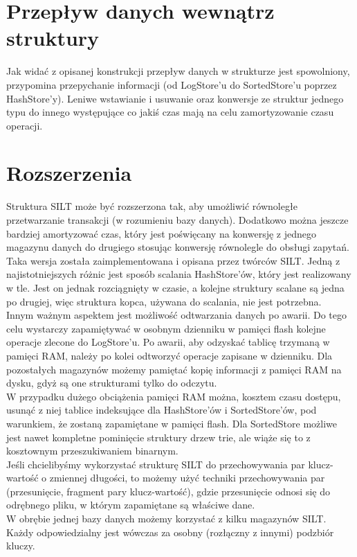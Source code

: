 \documentclass[declaration,shortabstract,masc]{iithesis}
\begin{document}
		\section{Przepływ danych wewnątrz struktury}
			Jak widać z opisanej konstrukcji przepływ danych w strukturze jest spowolniony, przypomina przepychanie informacji (od LogStore'u do SortedStore'u poprzez HashStore'y). Leniwe wstawianie i usuwanie oraz konwersje ze struktur jednego typu do innego występujące co jakiś czas mają na celu zamortyzowanie czasu operacji.
		\section{Rozszerzenia}
			Struktura SILT może być rozszerzona tak, aby umożliwić równoległe przetwarzanie transakcji (w rozumieniu bazy danych). Dodatkowo można jeszcze bardziej amortyzować czas, który jest poświęcany na konwersję z jednego magazynu danych do drugiego stosując konwersję równolegle do obsługi zapytań. Taka wersja została zaimplementowana i opisana przez twórców SILT. Jedną z najistotniejszych różnic jest sposób scalania HashStore'ów, który jest realizowany w tle. Jest on jednak rozciągnięty w czasie, a kolejne struktury scalane są jedna po drugiej, więc struktura kopca, używana do scalania, nie jest potrzebna.\\
			\indent Innym ważnym aspektem jest możliwość odtwarzania danych po awarii. Do tego celu wystarczy zapamiętywać w osobnym dzienniku w pamięci flash kolejne operacje zlecone do LogStore'u. Po awarii, aby odzyskać tablicę trzymaną w pamięci RAM, należy po kolei odtworzyć operacje zapisane w dzienniku. Dla pozostałych magazynów możemy pamiętać kopię informacji z pamięci RAM na dysku, gdyż są one strukturami tylko do odczytu.\\
			\indent W przypadku dużego obciążenia pamięci RAM można, kosztem czasu dostępu, usunąć z niej tablice indeksujące dla HashStore'ów i SortedStore'ów, pod warunkiem, że zostaną zapamiętane w pamięci flash. Dla SortedStore możliwe jest nawet kompletne pominięcie struktury drzew trie, ale wiąże się to z kosztownym przeszukiwaniem binarnym.\\
			\indent Jeśli chcielibyśmy wykorzystać strukturę SILT do przechowywania par klucz-wartość o zmiennej długości, to możemy użyć techniki przechowywania par (przesunięcie, fragment pary klucz-wartość), gdzie przesunięcie odnosi się do odrębnego pliku, w którym zapamiętane są właściwe dane.\\
			\indent W obrębie jednej bazy danych możemy korzystać z kilku magazynów SILT. Każdy odpowiedzialny jest wówczas za osobny (rozłączny z innymi) podzbiór kluczy.
\end{document}
